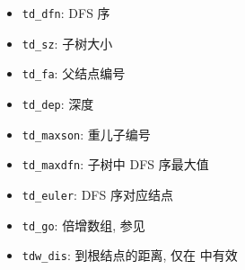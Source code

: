 \begin{itemize}
    \item \verb|td_dfn|: DFS 序
    \item \verb|td_sz|: 子树大小
    \item \verb|td_fa|: 父结点编号
    \item \verb|td_dep|: 深度
    \item \verb|td_maxson|: 重儿子编号
    \item \verb|td_maxdfn|: 子树中 DFS 序最大值
    \item \verb|td_euler|: DFS 序对应结点
    \item \verb|td_go|: 倍增数组, 参见 
    \item \verb|tdw_dis|: 到根结点的距离, 仅在  中有效
\end{itemize}
